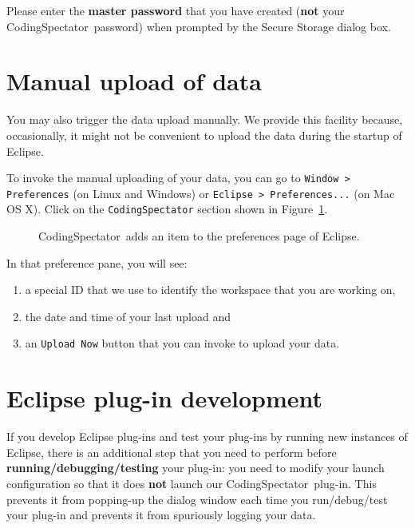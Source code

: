 \documentclass{article}
\newcommand{\fig}[1]{\imgsrc{#1.png}}
\newcommand\fig[1]{\texttt{[image: \#1]}}%
\newcommand\codspec{CodingSpectator}
\newcommand\uiref[1]{\texttt{#1}}
\begin{document}
Please enter the \textbf{master password} that you have created (\textbf{not}
your \codspec\ password) when prompted by the Secure Storage dialog box.

\section{Manual upload of data}

You may also trigger the data upload manually. We provide this facility because,
occasionally, it might not be convenient to upload the data during the startup
of Eclipse.

To invoke the manual uploading of your data, you can go to \uiref{Window >
Preferences} (on Linux and Windows) or \uiref{Eclipse > Preferences...} (on Mac
OS X). Click on the \uiref{\codspec} section shown in
Figure~\ref{FigPreferences}.

\begin{figure}[h]
%
\centering
%
\fig{figs/preferences}
%
\caption{\label{FigPreferences}\codspec\ adds an item to the preferences page of
Eclipse.}
%
\end{figure}

In that preference pane, you will see:

\begin{enumerate}
%
\item a special ID that we use to identify the workspace that you are working
on,
%
\item the date and time of your last upload and
%
\item an \uiref{Upload Now} button that you can invoke to upload your data.
%
\end{enumerate}

\section{Eclipse plug-in development}

If you develop Eclipse plug-ins and test your plug-ins by running new instances
of Eclipse, there is an additional step that you need to perform before
\textbf{running/debugging/testing} your plug-in: you need to modify your launch
configuration so that it does \textbf{not} launch our \codspec\ plug-in. This
prevents it from popping-up the dialog window each time you run/debug/test your
plug-in and prevents it from spuriously logging your data.
\end{document}
